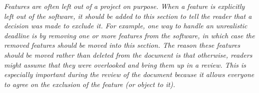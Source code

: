 \documentclass[12pt]{article}
\begin{document}
    \textit{Features are often left out of a project on purpose. When a
    feature is explicitly left out of the software, it should be added
    to this section to tell the reader that a decision was made to
    exclude it. For example, one way to handle an unrealistic deadline
    is by removing one or more features from the software, in which
    case the removed features should be moved into this section. The
    reason these features should be moved rather than deleted from the
    document is that otherwise, readers might assume that they were
    overlooked and bring them up in a review. This is especially
    important during the review of the document because it allows
    everyone to agree on the exclusion of the feature (or object to
    it).}
\end{document}
